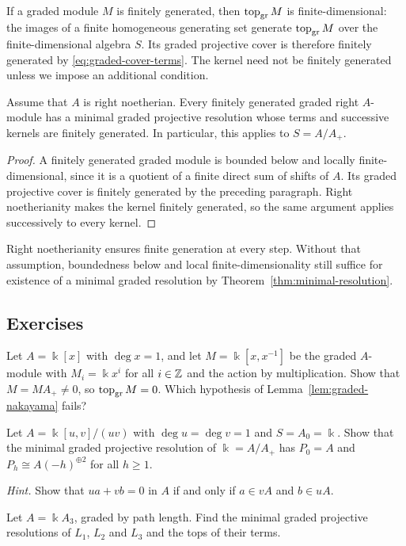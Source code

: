 If a graded module $M$ is finitely generated, then $\operatorname{top}\nolimits_{\mathrm{gr}} M$ is finite-dimensional: the images of a finite homogeneous generating set generate $\operatorname{top}\nolimits_{\mathrm{gr}} M$ over the finite-dimensional algebra $S$.
Its graded projective cover is therefore finitely generated by \eqref{eq:graded-cover-terms}.
The kernel need not be finitely generated unless we impose an additional condition.

\begin{corollary}\label{cor:noetherian-minimal-resolution}
Assume that $A$ is right noetherian.
Every finitely generated graded right $A$-module has a minimal graded projective resolution whose terms and successive kernels are finitely generated.
In particular, this applies to $S=A/A_+$.
\end{corollary}

\begin{proof}
A finitely generated graded module is bounded below and locally finite-dimensional, since it is a quotient of a finite direct sum of shifts of $A$.
Its graded projective cover is finitely generated by the preceding paragraph.
Right noetherianity makes the kernel finitely generated, so the same argument applies successively to every kernel.
\end{proof}

Right noetherianity ensures finite generation at every step.
Without that assumption, boundedness below and local finite-dimensionality still suffice for existence of a minimal graded resolution by Theorem~\ref{thm:minimal-resolution}.


\subsection{Exercises}

\begin{exercise}
Let $A=\Bbbk[x]$ with $\deg x=1$, and let $M=\Bbbk[x,x^{-1}]$ be the graded $A$-module with $M_i=\Bbbk x^i$ for all $i\in\mathbb{Z}$ and the action by multiplication.
Show that $M=MA_+\neq0$, so $\operatorname{top}\nolimits_{\mathrm{gr}} M=0$.
Which hypothesis of Lemma~\ref{lem:graded-nakayama} fails?
\end{exercise}

\begin{exercise}
Let $A=\Bbbk[u,v]/(uv)$ with $\deg u=\deg v=1$ and $S=A_0=\Bbbk$.
Show that the minimal graded projective resolution of $\Bbbk=A/A_+$ has $P_0=A$ and $P_h\cong A(-h)^{\oplus2}$ for all $h\geq1$.

\emph{Hint.} Show that $ua+vb=0$ in $A$ if and only if $a\in vA$ and $b\in uA$.
\end{exercise}

\begin{exercise}
Let $A=\Bbbk A_3$, graded by path length.
Find the minimal graded projective resolutions of $L_1$, $L_2$ and $L_3$ and the tops of their terms.
\end{exercise}
